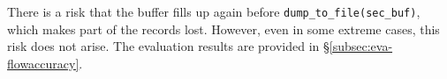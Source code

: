 There is a risk that the buffer fills up again before \texttt{dump\_to\_file(sec\_buf)}, which makes part of the records lost. However, even in some extreme cases, this risk does not arise. The evaluation results are provided in \S\ref{subsec:eva-flowaccuracy}.


